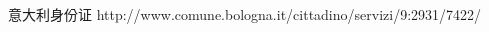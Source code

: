 \begin{thebibliography}{90}             %
\rhead[\fancyplain{}{\bfseries \leftmark}]{\fancyplain{}{\bfseries
\thepage}}
意大利身份证 http://www.comune.bologna.it/cittadino/servizi/9:2931/7422/
\end{thebibliography}
